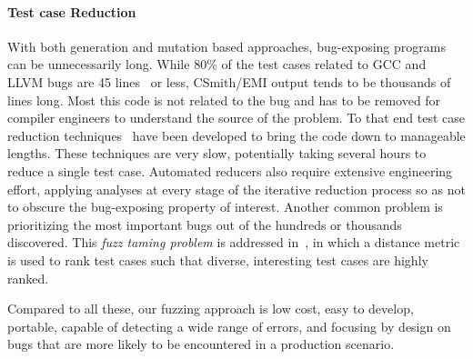 \paragraph{Test case Reduction} With both generation and mutation based approaches, bug-exposing programs can be unnecessarily long. While 80\% of the test cases related to GCC and LLVM bugs are 45 lines~\cite{Sun2016} or less, CSmith/EMI output tends to be thousands of lines long. Most this code is not related to the bug and has to be removed for compiler engineers to understand the source of the problem. To that end test case reduction techniques~\cite{Regehr2012a,Pflanzer2016,Herfert} have been developed to bring the code down to manageable lengths. These techniques are very slow, potentially taking several hours to reduce a single test case. Automated reducers also require extensive engineering effort, applying analyses at every stage of the iterative reduction process so as not to obscure the bug-exposing property of interest. Another common problem is prioritizing the most important bugs out of the hundreds or thousands discovered. This \emph{fuzz taming problem} is addressed in~\cite{Chen2013}, in which a distance metric is used to rank test cases such that diverse, interesting test cases are highly ranked. %

Compared to all these, our fuzzing approach is low cost, easy to develop, portable, capable of detecting a wide range of errors, and focusing by design on bugs that are more likely to be encountered in a production scenario.





